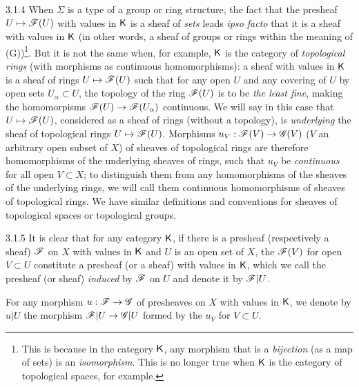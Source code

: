 \begin{env}{3.1.4}
\label{env-0.3.1.4}
When $\Sigma$ is a type of a group or ring structure, the fact that the presheaf
$U\mapsto\mathscr{F}(U)$ with values in $\mathsf{K}$ is a sheaf of \emph{sets} leads \emph{ipso facto}
that it is a sheaf with values in $\mathsf{K}$ (in other words, a sheaf of groups or rings within the
meaning of (G))\footnote{This is because in the category $\mathsf{K}$, any morphism that is a
\emph{bijection} (as a map of sets) is an \emph{isomorphism}. This is no longer true when
$\mathsf{K}$ is the category of topological spaces, for example.}. But it is not the same when, for
example, $\mathsf{K}$ is the category of \emph{topological rings} (with morphisms as continuous
homomorphisms): a sheaf with values in $\mathsf{K}$ is a sheaf of rings $U\mapsto\mathscr{F}(U)$ such that
for any open $U$ and any covering of $U$ by open sets $U_\alpha\subset U$, the topology of
the ring $\mathscr{F}(U)$ is to be \emph{the least fine}, making the homomorpisms
$\mathscr{F}(U)\to\mathscr{F}(U_\alpha)$ continuous. We will say in this case that $U\mapsto\mathscr{F}(U)$,
considered as a sheaf of rings (without a topology), is \emph{underlying} the sheaf of
topological rings $U\mapsto\mathscr{F}(U)$. Morphisms $u_V:\mathscr{F}(V)\to\mathscr{G}(V)$ ($V$ an
arbitrary open subset of $X$) of sheaves of topological rings are therefore homomorphisms of
the underlying sheaves of rings, such that $u_V$ be \emph{continuous} for all open
$V\subset X$; to distinguish them from any homomorphisms of the sheaves of the underlying
rings, we will call them continuous homomorphisms of sheaves of topological rings. We have
similar definitions and conventions for sheaves of topological spaces or topological groups.
\end{env}

\begin{env}{3.1.5}
\label{env-0.3.1.5}
It is clear that for any category $\mathsf{K}$, if there is a presheaf (respectively a sheaf)
$\mathscr{F}$ on $X$ with values in $\mathsf{K}$ and $U$ is an open set of $X$, the $\mathscr{F}(V)$ for open
$V\subset U$ constitute a presheaf (or a sheaf) with values in $\mathsf{K}$, which we call the
presheaf (or sheaf) \emph{induced} by $\mathscr{F}$ on $U$ and denote it by $\mathscr{F}|U$.

For any morphism $u:\mathscr{F}\to\mathscr{G}$ of presheaves on $X$ with values in $\mathsf{K}$, we denote by
$u|U$ the morphism $\mathscr{F}|U\to\mathscr{G}|U$ formed by the $u_V$ for $V\subset U$.
\end{env}

